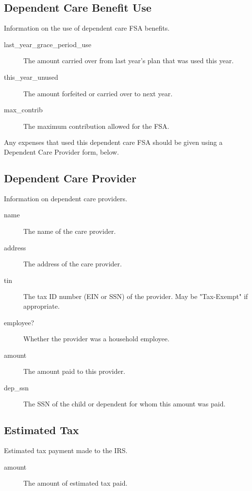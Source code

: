 \subsection{Dependent Care Benefit Use}

Information on the use of dependent care FSA benefits.

\begin{description}
\item[last\_year\_grace\_period\_use] The amount carried over from last year's
plan that was used this year.
\item[this\_year\_unused] The amount forfeited or carried over to next year.
\item[max\_contrib] The maximum contribution allowed for the FSA.
\end{description}

Any expenses that used this dependent care FSA should be given using a Dependent
Care Provider form, below.

\subsection{Dependent Care Provider}

Information on dependent care providers.

\begin{description}
\item[name] The name of the care provider.
\item[address] The address of the care provider.
\item[tin] The tax ID number (EIN or SSN) of the provider. May be "Tax-Exempt"
if appropriate.
\item[employee?] Whether the provider was a household employee.
\item[amount] The amount paid to this provider.
\item[dep\_ssn] The SSN of the child or dependent for whom this amount was paid.
\end{description}


\subsection{Estimated Tax}

Estimated tax payment made to the IRS.

\begin{description}
\item[amount] The amount of estimated tax paid.
\end{description}

